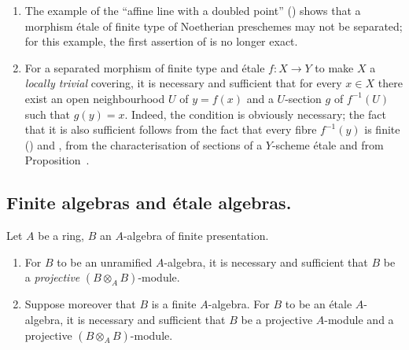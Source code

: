\begin{remarks}[18.2.10]
\label{IV.18.2.10}
\begin{enumerate}
  \item[(i)] The example of the ``affine line with a doubled point'' () shows that a morphism \'etale of finite type of Noetherian preschemes may not be separated;
for this example, the first assertion of  is no longer exact.

  \item[(ii)] For a separated morphism of finite type and \'etale $f:X\to Y$ to make $X$ a \emph{locally trivial} covering, it is necessary and sufficient that for every $x\in X$ there exist an open neighbourhood $U$ of $y=f(x)$ and a $U$-section $g$ of $f^{-1}(U)$ such that $g(y)=x$.
Indeed, the condition is obviously necessary;
the fact that it is also sufficient follows from the fact that every fibre $f^{-1}(y)$ is finite () and , from the characterisation of sections of a $Y$-scheme \'etale  and from Proposition~.
\end{enumerate}
\end{remarks}


\subsection{Finite algebras and \'etale algebras.}
\label{subsection:IV.18.3}

\begin{proposition}[18.3.1]
\label{IV.18.3.1}
Let $A$ be a ring, $B$ an $A$-algebra of finite presentation.
\begin{enumerate}
  \item[(i)] For $B$ to be an unramified $A$-algebra, it is necessary and sufficient that $B$ be a \emph{projective} $(B\otimes_A B)$-module.
  \item[(ii)] Suppose moreover that $B$ is a finite $A$-algebra.  For $B$ to be an \'etale $A$-algebra, it is necessary and sufficient that $B$ be a projective $A$-module and a projective $(B\otimes_A B)$-module.
\end{enumerate}
\end{proposition}

